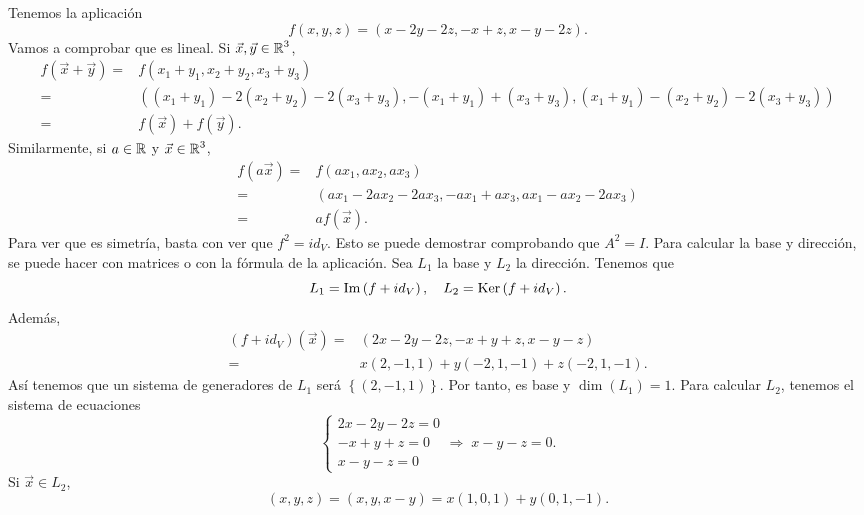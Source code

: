 \documentclass{article}
\begin{document}
\begin{sol}
Tenemos la aplicación 
\[f\left(x,y,z\right) = \left(x - 2y - 2z, -x + z, x - y - 2z\right) .\]
Vamos a comprobar que es lineal. Si $\displaystyle \vec{x}, \vec{y} \in \mathbb{R}^{3} $,
\[
\begin{split}
	f\left(\vec{x}+\vec{y}\right) = & f\left(x_{1}+y_{1}, x_{2}+y_{2}, x_{3}+y_{3}\right) \\
	= &  \left(\left(x_{1}+y_{1}\right)-2\left(x_{2}+y_{2}\right)-2\left(x_{3}+y_{3}\right), -\left(x_{1}+y_{1}\right) + \left(x_{3}+y_{3}\right), \left(x_{1}+y_{1}\right)-\left(x_{2}+y_{2}\right)-2\left(x_{3}+y_{3}\right)\right) \\
	= & f\left(\vec{x}\right)+f\left(\vec{y}\right) .
\end{split}
\]
Similarmente, si $\displaystyle a \in \mathbb{R} $ y $\displaystyle \vec{x}\in \mathbb{R}^{3} $,
\[
\begin{split}
	f\left(a\vec{x}\right) = & f\left(ax_{1}, ax_{2}, ax_{3}\right) \\
	= & \left(ax_{1}-2ax_{2}-2ax_{3}, -ax_{1}+ax_{3}, ax_{1}-ax_{2}-2ax_{3}\right)\\
	= & af\left(\vec{x}\right).
\end{split}
\]
Para ver que es simetría, basta con ver que $\displaystyle f^{2} = id _{V} $. Esto se puede demostrar comprobando que $\displaystyle A^{2} = I $. Para calcular la base y dirección, se puede hacer con matrices o con la fórmula de la aplicación. Sea $\displaystyle L_{1} $ la base y $\displaystyle L_{2} $ la dirección. Tenemos que
\[L_{1} = \operatorname{Im}\left(f + id _{V}\right), \quad L_{2} = \operatorname{Ker}\left(f+id _{V}\right) .\]
Además, 
\[
\begin{split}
	\left(f + id _{V}\right)\left(\vec{x}\right) = & \left(2x-2y-2z,-x +y + z, x -y-z\right) \\
	= & x\left(2, -1, 1\right) + y\left(-2, 1, -1\right) + z\left(-2, 1, -1\right).
\end{split}
\]
Así tenemos que un sistema de generadores de $\displaystyle L_{1} $ será $\displaystyle \left\{ \left(2, - 1, 1\right)\right\}  $. Por tanto, es base y $\displaystyle \dim\left(L_{1}\right) = 1 $.
Para calcular $\displaystyle L_{2} $, tenemos el sistema de ecuaciones
\[ 
\begin{cases}
2x-2y-2z = 0 \\
-x+y+z = 0 \\
x -y-z = 0
\end{cases}
\Rightarrow \; x -y-z = 0
.\]
Si $\displaystyle \vec{x} \in L_{2} $,
\[\left(x,y,z\right) = \left(x, y, x -y\right) = x\left(1,0,1\right) + y\left(0,1,-1\right) .\]

\end{sol}
\end{document}
